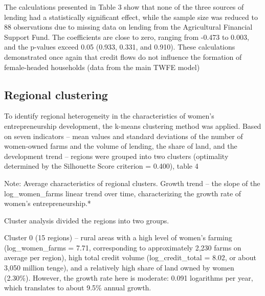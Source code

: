 ﻿\documentclass[sn-mathphys-num]{sn-jnl}
\begin{document}
The calculations presented in Table 3 show that none of the three
sources of lending had a statistically significant effect, while the
sample size was reduced to 88 observations due to missing data on
lending from the Agricultural Financial Support Fund. The coefficients
are close to zero, ranging from -0.473 to 0.003, and the p-values exceed
0.05 (0.933, 0.331, and 0.910). These calculations demonstrated once
again that credit flows do not influence the formation of female-headed
households (data from the main TWFE model)

\subsection{Regional clustering}

To identify regional heterogeneity in the characteristics of women's
entrepreneurship development, the k-means clustering method was applied.
Based on seven indicators -- mean values and standard deviations of the
number of women-owned farms and the volume of lending, the share of
land, and the development trend -- regions were grouped into two
clusters (optimality determined by the Silhouette Score criterion =
0.400), table 4

\begin{table}[h]
\caption{Regional cluster profiles}\label{tab:cluster-profiles}
\scriptsize
\renewcommand{\arraystretch}{1.1}
\renewcommand{\arraystretch}{1}
\end{table}

Note: Average characteristics of regional clusters. Growth trend -- the
slope of the log\_women\_farms linear trend over time, characterizing
the growth rate of women's entrepreneurship.*

Cluster analysis divided the regions into two groups.

Cluster 0 (15 regions) -- rural areas with a high level of women's
farming (log\_women\_farms = 7.71, corresponding to approximately 2,230
farms on average per region), high total credit volume
(log\_credit\_total = 8.02, or about 3,050 million tenge), and a
relatively high share of land owned by women (2.30\%). However, the
growth rate here is moderate: 0.091 logarithms per year, which
translates to about 9.5\% annual growth.
\end{document}
